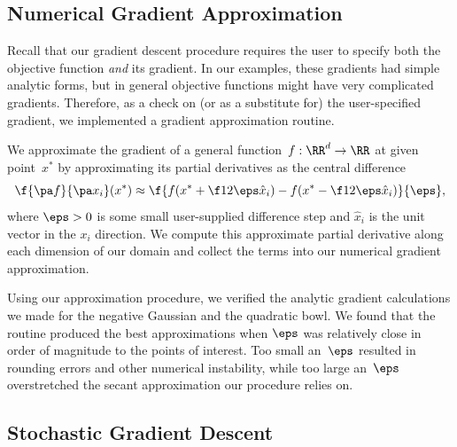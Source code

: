 \documentclass{article}
\begin{document}
\begin{multicols}{2}
\subsection{Numerical Gradient Approximation}
\label{subsec:grad-approx}

Recall that our gradient descent procedure requires the user to specify both the objective function \emph{and} its gradient. In our examples, these gradients had simple analytic forms, but in general objective functions might have very complicated gradients. Therefore, as a check on (or as a substitute for) the user-specified gradient, we implemented a gradient approximation routine.

We approximate the gradient of a general function~$f:\RR^d\to\RR$ at given point~$x^*$ by approximating its partial derivatives as the central difference
\begin{equation}
\label{eq:grad-approx}
\f{\pa f}{\pa x_i}(x^*) \approx \f{f(x^* + \f12\eps\hat x_i) - f(x^* - \f12 \eps\hat x_i)}{\eps},
\end{equation}
where $\eps > 0$ is some small user-supplied difference step and $\hat x_i$ is the unit vector in the $x_i$ direction. We compute this approximate partial derivative along each dimension of our domain and collect the terms into our numerical gradient approximation. 

Using our approximation procedure, we verified the analytic gradient calculations we made for the negative Gaussian and the quadratic bowl.
We found that the routine produced the best approximations when $\eps$ was relatively close in order of magnitude to the points of interest. %
Too small an~$\eps$ resulted in rounding errors and other numerical instability, while too large an~$\eps$ overstretched the secant approximation our procedure relies on.



\subsection{Stochastic Gradient Descent}


\end{multicols}
\end{document}
